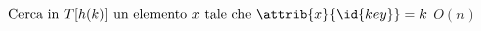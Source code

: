 \begin{codebox}
\li	$\text{Cerca in } T[h(k)] \text{ un elemento } x \text{ tale che } \attrib{x}{\id{key}} = k$ 
	\Comment $O(n)$
\end{codebox}